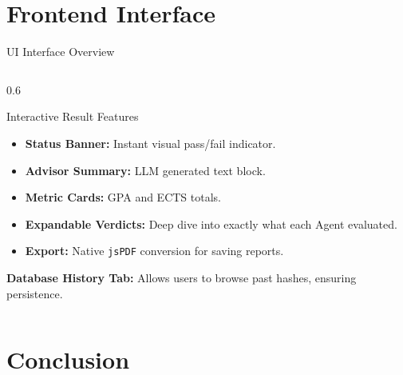 \documentclass[aspectratio=169]{beamer}
\begin{document}
\section{Frontend Interface}

\begin{frame}{UI Interface Overview}
  \begin{columns} %
    \begin{column}{0.6\textwidth} 
      \begin{block}{Interactive Result Features}
        \begin{itemize}
          \item \textbf{Status Banner:} Instant visual pass/fail indicator.
          \item \textbf{Advisor Summary:} LLM generated text block.
          \item \textbf{Metric Cards:} GPA and ECTS totals.
          \item \textbf{Expandable Verdicts:} Deep dive into exactly what each Agent evaluated.
          \item \textbf{Export:} Native \texttt{jsPDF} conversion for saving reports.
        \end{itemize}
      \end{block}
      \vspace{0.5em}
      \footnotesize \textbf{Database History Tab:} Allows users to browse past hashes, ensuring persistence.
    \end{column}
  \end{columns}
\end{frame}
\section{Conclusion}
\end{document}
